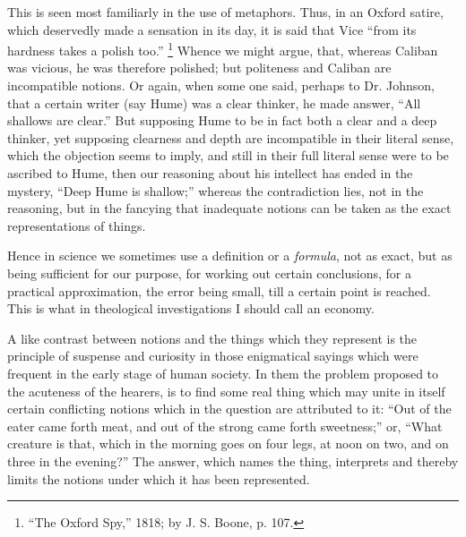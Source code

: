 This is seen most familiarly in the use of metaphors. Thus, in an
Oxford satire, which deservedly made a sensation in its day, it is
said that Vice ``from its hardness takes a polish too.'' \footnote{``The Oxford Spy,'' 1818; by J. S. Boone, p. 107.}
Whence we might argue, that, whereas Caliban was vicious, he was
therefore polished; but politeness and Caliban are incompatible
notions. Or again, when some one said, perhaps to Dr. Johnson, that a
certain writer (say Hume) was a clear thinker, he made answer,
``All shallows are clear.'' But supposing Hume to be in fact
both a clear and a deep thinker, yet supposing clearness and depth are
incompatible in their literal sense, which the objection seems to
imply, and still in their full literal sense were to be ascribed to
Hume, then our reasoning about his intellect has ended in the mystery,
``Deep Hume is shallow;'' whereas the contradiction lies, not
in the reasoning, but in the fancying that inadequate notions can be
taken as the exact representations of things.

Hence in science we sometimes use a definition or a \emph{formula},
not as exact, but as being sufficient for our purpose, for working out
certain conclusions, for a practical approximation, the error being
small, till a certain point is reached. This is what in theological
investigations I should call an economy.

A like contrast between notions and the things which they
represent is the principle of suspense and curiosity in those
enigmatical sayings which were frequent in the early stage of human
society. In them the problem proposed to the acuteness of the hearers,
is to find some real thing which may unite in itself certain
conflicting notions which in the question are attributed to it:
``Out of the eater came forth meat, and out of the strong came
forth sweetness;'' or, ``What creature is that, which in the
morning goes on four legs, at noon on two, and on three in the
evening?'' The answer, which names the thing, interprets and
thereby limits the notions under which it has been represented.

